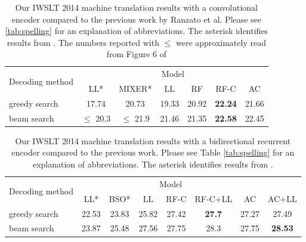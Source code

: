 \documentclass{article} %
\begin{document}
\begin{table}%
    \centering
    \caption{Our IWSLT 2014 machine translation results with a convolutional encoder compared to the previous work by Ranzato et al.
    Please see \ref{tab:spelling} for an explanation of abbreviations. The asterisk
    identifies results from \citep{ranzato2015sequence}. 
    The numbers reported with $\leq$ were approximately read from
    Figure 6 of \citep{ranzato2015sequence} }
    \begin{tabular}{l | c | c | c | c | c | c}
        \multirow{2}{*}{Decoding method} & \multicolumn{6}{|c}{Model} \\
                                         & LL* & MIXER* & LL & RF & RF-C & AC \\
        \hline\hline
        greedy search & 17.74       & 20.73       & 19.33 & 20.92 & \textbf{22.24} & 21.66 \\
        beam search   & $\leq$ 20.3 & $\leq$ 21.9 & 21.46 & 21.35 & \textbf{22.58} & 22.45 
    \end{tabular}
    \label{tab:mt}
\end{table}

\begin{table}%
    \centering
    \caption{
        Our IWSLT 2014 machine translation results with a bidirectional recurrent encoder compared to the previous work.
        Please see Table \ref{tab:spelling} for an explanation of abbreviations. The asterisk
        identifies results from \citep{wiseman2016sequence}. 
    }
    \begin{tabular}{l | c | c | c | c | c | c | c}
        \multirow{2}{*}{Decoding method} & \multicolumn{6}{|c}{Model} \\
                                         & LL* & BSO* & LL & RF-C & RF-C+LL & AC & AC+LL \\
        \hline\hline
        greedy search & 22.53 & 23.83 & 25.82 & 27.42 & \textbf{27.7} & 27.27 & 27.49\\
        beam search   & 23.87 & 25.48 & 27.56 & 27.75 & 28.3 & 27.75 & \textbf{28.53}
    \end{tabular}
    \label{tab:mt2}
\end{table}
\end{document}
